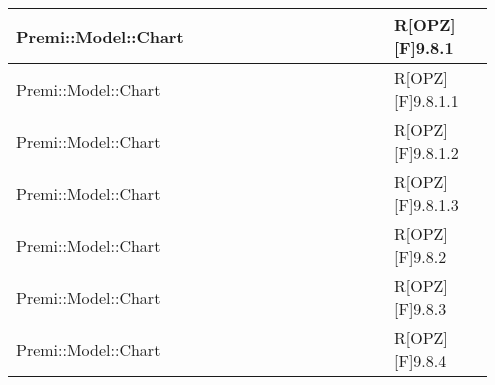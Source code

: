\begin{table}[h]
\begin{center}
\begin{tabular}{|p{0.75\linewidth}|p{0.2\linewidth}|}
		\midrule
			Premi::Model::Chart & R[OPZ][F]9.8.1 \\
		\midrule
			Premi::Model::Chart & R[OPZ][F]9.8.1.1 \\
		\midrule
			Premi::Model::Chart & R[OPZ][F]9.8.1.2 \\
		\midrule
			Premi::Model::Chart & R[OPZ][F]9.8.1.3 \\
		\midrule
			Premi::Model::Chart & R[OPZ][F]9.8.2 \\
		\midrule
			Premi::Model::Chart & R[OPZ][F]9.8.3 \\
		\midrule
			Premi::Model::Chart & R[OPZ][F]9.8.4 \\
		\bottomrule
		\end{tabular}
	\end{center}
\end{table}

